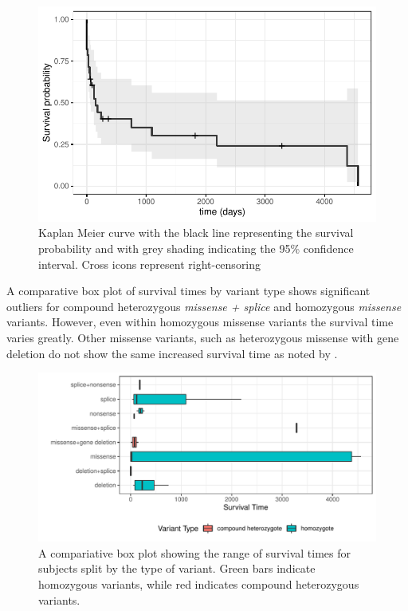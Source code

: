 \documentclass[
  authoryear,
  preprint,
  3p]{elsarticle}
\begin{document}
\begin{figure}

{\centering \includegraphics{paper_files/figure-pdf/fig-surv-1.pdf}

}

\caption{\label{fig-surv}Kaplan Meier curve with the black line
representing the survival probability and with grey shading indicating
the 95\% confidence interval. Cross icons represent right-censoring}

\end{figure}

A comparative box plot of survival times by variant type shows
significant outliers for compound heterozygous \emph{missense + splice}
and homozygous \emph{missense} variants. However, even within homozygous
missense variants the survival time varies greatly. Other missense
variants, such as heterozygous missense with gene deletion do not show
the same increased survival time as noted by \citet{magini2019loss}.

\begin{figure}

{\centering \includegraphics{paper_files/figure-pdf/fig-box-1.pdf}

}

\caption{\label{fig-box}A compariative box plot showing the range of
survival times for subjects split by the type of variant. Green bars
indicate homozygous variants, while red indicates compound heterozygous
variants.}

\end{figure}
\end{document}

